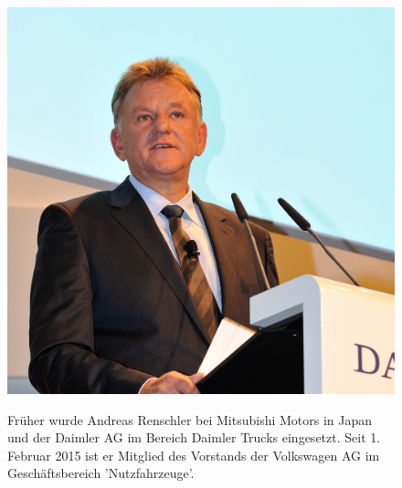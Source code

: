 \documentclass[12pt]{article}
\begin{document}
\begin{figure}[here!]
	\centering
	\begin{minipage}[h]{0.20\textwidth}
		\centering
		\includegraphics[width=1.0\textwidth]{images/AndreasRenschler.jpg}
		\label{fig:vorstandvw6}
		\cite{arpic}
	\end{minipage}
	\begin{minipage}[h]{0.10\textwidth}
		\hspace{1cm} 
	\end{minipage}
	\begin{minipage}[h]{0.65\textwidth}
		Früher wurde Andreas Renschler bei Mitsubishi Motors in Japan und der Daimler AG im Bereich Daimler Trucks eingesetzt. Seit 1. Februar 2015 ist er Mitglied des Vorstands der Volkswagen AG im Geschäftsbereich 'Nutzfahrzeuge'.
	\end{minipage}
\end{figure}
\end{document}
